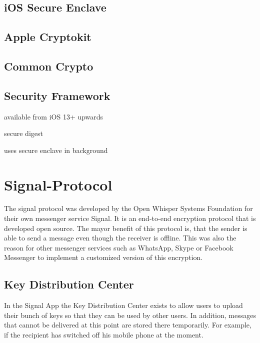 \documentclass[12pt,oneside,a4paper,parskip]{scrbook}
\begin{document}
\subsection{iOS Secure Enclave}

\subsection{Apple Cryptokit}

\subsection{Common Crypto}

\subsection{Security Framework}

available from iOS 13+ upwards

secure digest

uses secure enclave in background

\section{Signal-Protocol}

The signal protocol was developed by the Open Whisper Systems Foundation for their own messenger service Signal. It is an end-to-end encryption protocol that is developed open source. The mayor benefit of this protocol is, that the sender is able to send a message even though the receiver is offline. This was also the reason for other messenger services such as WhatsApp, Skype or Facebook Messenger to implement a customized version of this encryption. 

\parencite{cohn-gordon_formal_2017}
\newline

\subsection*{Key Distribution Center}
\label{subsec:KDC}

In the Signal App the Key Distribution Center exists to allow users to upload their bunch of keys so that they can be used by other users. In addition, messages that cannot be delivered at this point are stored there temporarily. For example, if the recipient has switched off his mobile phone at the moment. 
\end{document}

